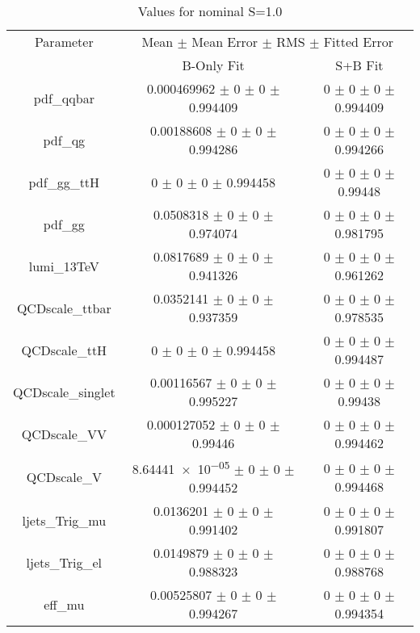\begin{table}
\centering
\caption{Values for nominal S=1.0}
\begin{tabular}{ccc}
\toprule
Parameter & \multicolumn{2}{c}{Mean $\pm$ Mean Error $\pm$ RMS $\pm$ Fitted Error}\\
 & B-Only Fit & S+B Fit\\
\midrule
pdf\_qqbar & \num{0.000469962} $\pm$ \num{0} $\pm$ \num{0} $\pm$ \num{0.994409} & \num{0} $\pm$ \num{0} $\pm$ \num{0} $\pm$ \num{0.994409}\\
pdf\_qg & \num{0.00188608} $\pm$ \num{0} $\pm$ \num{0} $\pm$ \num{0.994286} & \num{0} $\pm$ \num{0} $\pm$ \num{0} $\pm$ \num{0.994266}\\
pdf\_gg\_ttH & \num{0} $\pm$ \num{0} $\pm$ \num{0} $\pm$ \num{0.994458} & \num{0} $\pm$ \num{0} $\pm$ \num{0} $\pm$ \num{0.99448}\\
pdf\_gg & \num{0.0508318} $\pm$ \num{0} $\pm$ \num{0} $\pm$ \num{0.974074} & \num{0} $\pm$ \num{0} $\pm$ \num{0} $\pm$ \num{0.981795}\\
lumi\_13TeV & \num{0.0817689} $\pm$ \num{0} $\pm$ \num{0} $\pm$ \num{0.941326} & \num{0} $\pm$ \num{0} $\pm$ \num{0} $\pm$ \num{0.961262}\\
QCDscale\_ttbar & \num{0.0352141} $\pm$ \num{0} $\pm$ \num{0} $\pm$ \num{0.937359} & \num{0} $\pm$ \num{0} $\pm$ \num{0} $\pm$ \num{0.978535}\\
QCDscale\_ttH & \num{0} $\pm$ \num{0} $\pm$ \num{0} $\pm$ \num{0.994458} & \num{0} $\pm$ \num{0} $\pm$ \num{0} $\pm$ \num{0.994487}\\
QCDscale\_singlet & \num{0.00116567} $\pm$ \num{0} $\pm$ \num{0} $\pm$ \num{0.995227} & \num{0} $\pm$ \num{0} $\pm$ \num{0} $\pm$ \num{0.99438}\\
QCDscale\_VV & \num{0.000127052} $\pm$ \num{0} $\pm$ \num{0} $\pm$ \num{0.99446} & \num{0} $\pm$ \num{0} $\pm$ \num{0} $\pm$ \num{0.994462}\\
QCDscale\_V & \num{8.64441e-05} $\pm$ \num{0} $\pm$ \num{0} $\pm$ \num{0.994452} & \num{0} $\pm$ \num{0} $\pm$ \num{0} $\pm$ \num{0.994468}\\
ljets\_Trig\_mu & \num{0.0136201} $\pm$ \num{0} $\pm$ \num{0} $\pm$ \num{0.991402} & \num{0} $\pm$ \num{0} $\pm$ \num{0} $\pm$ \num{0.991807}\\
ljets\_Trig\_el & \num{0.0149879} $\pm$ \num{0} $\pm$ \num{0} $\pm$ \num{0.988323} & \num{0} $\pm$ \num{0} $\pm$ \num{0} $\pm$ \num{0.988768}\\
eff\_mu & \num{0.00525807} $\pm$ \num{0} $\pm$ \num{0} $\pm$ \num{0.994267} & \num{0} $\pm$ \num{0} $\pm$ \num{0} $\pm$ \num{0.994354}\\

\end{tabular}
\end{table}
